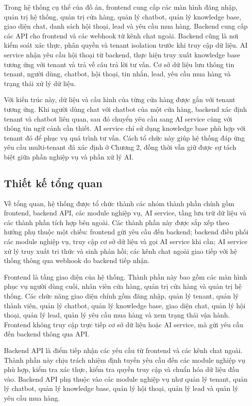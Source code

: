 \documentclass[../DoAn.tex]{subfiles}
\begin{document}
Trong hệ thống cụ thể của đồ án, frontend cung cấp các màn hình đăng nhập, quản trị hệ thống, quản trị cửa hàng, quản lý chatbot, quản lý knowledge base, giao diện chat, danh sách hội thoại, lead và yêu cầu mua hàng. Backend cung cấp các API cho frontend và các webhook từ kênh chat ngoài. Backend cũng là nơi kiểm soát xác thực, phân quyền và tenant isolation trước khi truy cập dữ liệu. AI service nhận yêu cầu hội thoại từ backend, thực hiện truy xuất knowledge base tương ứng với tenant và trả về câu trả lời tư vấn. Cơ sở dữ liệu lưu thông tin tenant, người dùng, chatbot, hội thoại, tin nhắn, lead, yêu cầu mua hàng và trạng thái xử lý dữ liệu.

Với kiến trúc này, dữ liệu và cấu hình của từng cửa hàng được gắn với tenant tương ứng. Khi người dùng chat với chatbot của một cửa hàng, backend xác định tenant và chatbot liên quan, sau đó chuyển yêu cầu sang AI service cùng với thông tin ngữ cảnh cần thiết. AI service chỉ sử dụng knowledge base phù hợp với tenant đó để phục vụ quá trình tư vấn. Cách tổ chức này giúp hệ thống đáp ứng yêu cầu multi-tenant đã xác định ở Chương 2, đồng thời vẫn giữ được sự tách biệt giữa phần nghiệp vụ và phần xử lý AI.

\subsection{Thiết kế tổng quan}

Về tổng quan, hệ thống được tổ chức thành các nhóm thành phần chính gồm frontend, backend API, các module nghiệp vụ, AI service, tầng lưu trữ dữ liệu và các thành phần tích hợp bên ngoài. Các thành phần này được sắp xếp theo hướng phụ thuộc một chiều: frontend gửi yêu cầu đến backend; backend điều phối các module nghiệp vụ, truy cập cơ sở dữ liệu và gọi AI service khi cần; AI service xử lý truy xuất tri thức và sinh phản hồi; các kênh chat ngoài giao tiếp với hệ thống thông qua webhook do backend tiếp nhận.

Frontend là tầng giao diện của hệ thống. Thành phần này bao gồm các màn hình phục vụ người dùng cuối, nhân viên cửa hàng, quản trị cửa hàng và quản trị hệ thống. Các chức năng giao diện chính gồm đăng nhập, quản lý tenant, quản lý thành viên, quản lý chatbot, quản lý knowledge base, giao diện chat, quản lý hội thoại, quản lý lead, quản lý yêu cầu mua hàng và xem trạng thái vận hành. Frontend không truy cập trực tiếp cơ sở dữ liệu hoặc AI service, mà gửi yêu cầu đến backend thông qua API.

Backend API là điểm tiếp nhận các yêu cầu từ frontend và các kênh chat ngoài. Thành phần này chịu trách nhiệm định tuyến yêu cầu đến các module nghiệp vụ phù hợp, kiểm tra xác thực, kiểm tra quyền truy cập và chuẩn hóa dữ liệu đầu vào. Backend API phụ thuộc vào các module nghiệp vụ như quản lý tenant, quản lý chatbot, quản lý knowledge base, quản lý hội thoại, quản lý lead và quản lý yêu cầu mua hàng.
\end{document}
